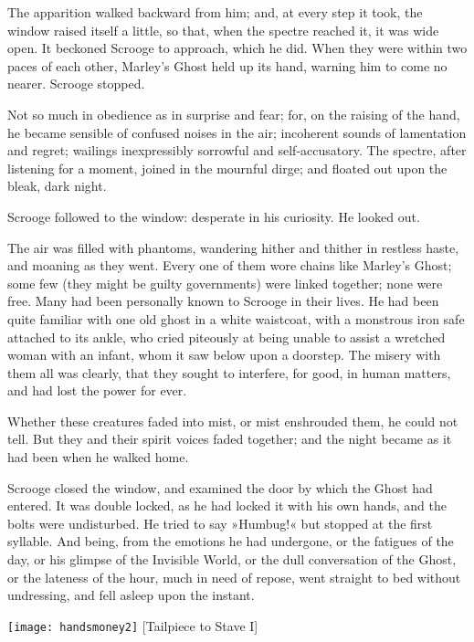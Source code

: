 The apparition walked backward from him; and, at every step it took, the window raised itself a little, so that, when the spectre reached it, it was wide open. It beckoned Scrooge to approach, which he did. When they were within two paces of each other, Marley's Ghost held up its hand, warning him to come no nearer. Scrooge stopped.

Not so much in obedience as in surprise and fear; for, on the raising of the hand, he became sensible of confused noises in the air; incoherent sounds of lamentation and regret; wailings inexpressibly sorrowful and self-accusatory. The spectre, after listening for a moment, joined in the mournful dirge; and floated out upon the bleak, dark night.

Scrooge followed to the window: desperate in his curiosity. He looked out.

The air was filled with phantoms, wandering hither and thither in restless haste, and moaning as they went. Every one of them wore chains like Marley's Ghost; some few (they might be guilty governments) were linked together; none were free. Many had been personally known to Scrooge in their lives. He had been quite familiar with one old ghost in a white waistcoat, with a monstrous iron safe attached to its ankle, who cried piteously at being unable to assist a wretched woman with an infant, whom it saw below upon a doorstep. The misery with them all was clearly, that they sought to interfere, for good, in human matters, and had lost the power for ever.

Whether these creatures faded into mist, or mist enshrouded them, he could not tell. But they and their spirit voices faded together; and the night became as it had been when he walked home.

Scrooge closed the window, and examined the door by which the Ghost had entered. It was double locked, as he had locked it with his own hands, and the bolts were undisturbed. He tried to say »Humbug!« but stopped at the first syllable. And being, from the emotions he had undergone, or the fatigues of the day, or his glimpse of the Invisible World, or the dull conversation of the Ghost, or the lateness of the hour, much in need of repose, went straight to bed without undressing, and fell asleep upon the instant.
\nopagebreak[4]
\begin{center}
\texttt{[image: handsmoney2]}
[Tailpiece to Stave I]{}
\end{center}

